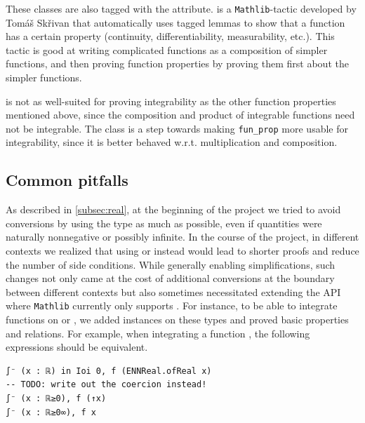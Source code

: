\documentclass[12pt]{amsart}
\newcommand{\mathlib}{\texttt{Mathlib}\xspace}
\theoremstyle{definition}
\theoremstyle{plain}
\begin{document}
These classes are also tagged with the  attribute.
 is a \mathlib-tactic developed by Tomáš Skřivan
that automatically uses tagged lemmas to show that a function has a certain property
(continuity, differentiability, measurability, etc.).
This tactic is good at writing complicated functions as a composition of simpler functions,
and then proving function properties by proving them first about the simpler functions.

 is not as well-suited for proving integrability
as the other function properties mentioned above,
since the composition and product of integrable functions need not be integrable.
The class  is a step towards
making \texttt{fun\_prop} more usable for integrability,
since it is better behaved w.r.t. multiplication and composition.


\subsection{Common pitfalls}\label{subsec:pitfalls}
As described in \ref{subsec:real}, at the beginning of the project we tried to avoid conversions by using the type  as much as possible, even if quantities were naturally nonnegative or possibly infinite. In the course of the project, in different contexts we realized that using  or  instead would lead to shorter proofs and reduce the number of side conditions.
While generally enabling simplifications, such changes not only came at the cost of additional conversions at the boundary between different contexts but also sometimes necessitated extending the API where \mathlib currently only supports . For instance, to be able to integrate functions on  or , we added  instances on these types and proved basic properties and relations. For example, when integrating a function , the following expressions should be equivalent.
\begin{verbatim}
∫⁻ (x : ℝ) in Ioi 0, f (ENNReal.ofReal x)
-- TODO: write out the coercion instead!
∫⁻ (x : ℝ≥0), f (↑x)
∫⁻ (x : ℝ≥0∞), f x
\end{verbatim}
\end{document}
